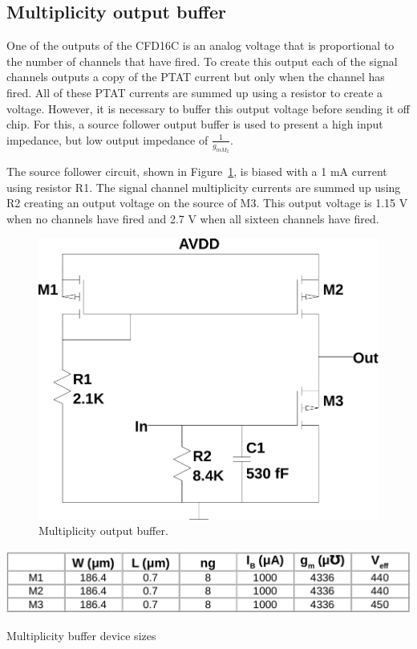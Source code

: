 \documentclass[12pt,oneside,final]{siuethesis}
\theoremstyle{definition}
\begin{document}
\subsection{Multiplicity output buffer}
\par One of the outputs of the CFD16C is an analog voltage that is proportional to the number of channels that have fired. To create this output each of the signal channels outputs a copy of the PTAT current but only when the channel has fired. All of these PTAT currents are summed up using a resistor to create a voltage. However, it is necessary to buffer this output voltage before sending it off chip. For this, a source follower output buffer is used to present a high input impedance, but low output impedance of $\frac{1}{g_{m M_{2}}}$. 
\par The source follower circuit, shown in Figure~\ref{fig:mult}, is biased with a 1 mA current using resistor R1. The signal channel multiplicity currents are summed up using R2 creating an output voltage on the source of M3. This output voltage is 1.15 V when no channels have fired and 2.7 V when all sixteen channels have fired. 

\begin{figure}[htbp!]
\centering
\includegraphics[scale=.45,keepaspectratio=true]{../LTspice_Drawings/multiplicity/mult_buffer.png} 
\caption{Multiplicity output buffer.}
\label{fig:mult}
\end{figure}

\begin{table}[htbp!]
 \centering
 \includegraphics[scale=.4,keepaspectratio=true]{./ch3_figures/mult_sizes.png}
 \caption{Multiplicity buffer device sizes}
 \label{tab:dac-bit-sizes}
\end{table}
\end{document}
